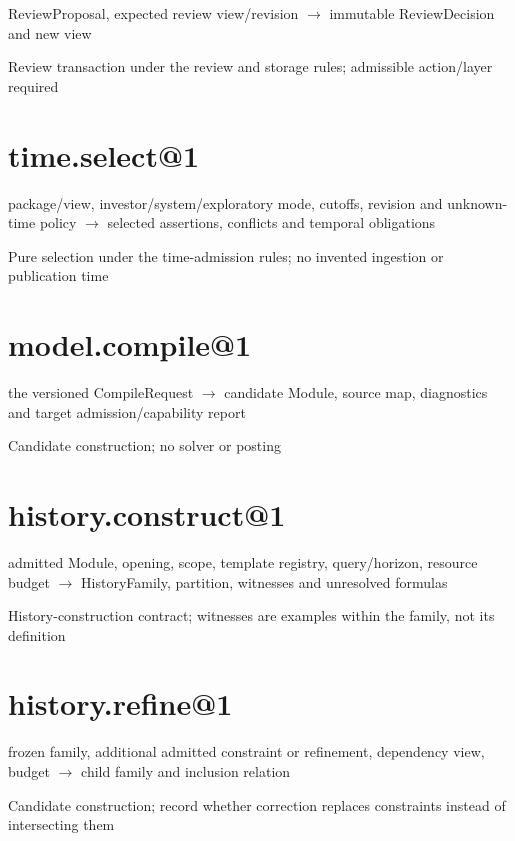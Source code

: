 ReviewProposal, expected review view/revision \ensuremath{\rightarrow} immutable ReviewDecision and new view

Review transaction under the review and storage rules; admissible action/layer required

\hypertarget{time.select1}{%
\section{time.select@1}\label{time.select1}}

package/view, investor/system/exploratory mode, cutoffs, revision and unknown-time policy \ensuremath{\rightarrow} selected assertions, conflicts and temporal obligations

Pure selection under the time-admission rules; no invented ingestion or publication time

\hypertarget{model.compile1}{%
\section{model.compile@1}\label{model.compile1}}

the versioned CompileRequest \ensuremath{\rightarrow} candidate Module, source map, diagnostics and target admission/capability report

Candidate construction; no solver or posting

\hypertarget{history.construct1}{%
\section{history.construct@1}\label{history.construct1}}

admitted Module, opening, scope, template registry, query/horizon, resource budget \ensuremath{\rightarrow} HistoryFamily, partition, witnesses and unresolved formulas

History-construction contract; witnesses are examples within the family, not its definition

\hypertarget{history.refine1}{%
\section{history.refine@1}\label{history.refine1}}

frozen family, additional admitted constraint or refinement, dependency view, budget \ensuremath{\rightarrow} child family and inclusion relation

Candidate construction; record whether correction replaces constraints instead of intersecting them

